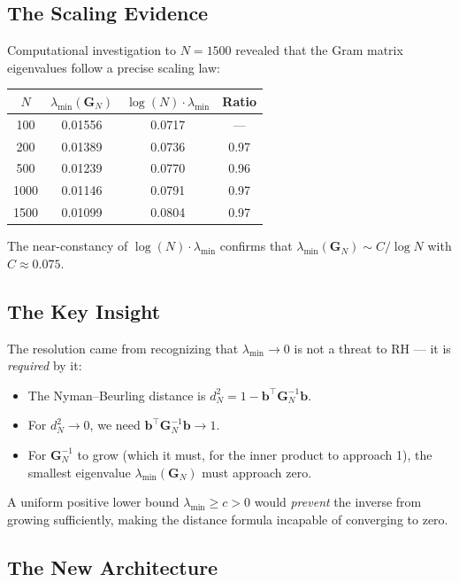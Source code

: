 \documentclass[11pt,a4paper]{article}
\theoremstyle{definition}
\theoremstyle{remark}
\newcommand{\Gram}{\mathbf{G}}
\newcommand{\lmin}{\lambda_{\min}}
\begin{document}
\subsection{The Scaling Evidence}

Computational investigation to $N = 1500$ revealed that the Gram matrix
eigenvalues follow a precise scaling law:

\begin{center}
\begin{tabular}{cccc}
\hline
$N$ & $\lmin(\Gram_N)$ & $\log(N) \cdot \lmin$ & Ratio \\
\hline
100  & 0.01556 & 0.0717 & --- \\
200  & 0.01389 & 0.0736 & 0.97 \\
500  & 0.01239 & 0.0770 & 0.96 \\
1000 & 0.01146 & 0.0791 & 0.97 \\
1500 & 0.01099 & 0.0804 & 0.97 \\
\hline
\end{tabular}
\end{center}

The near-constancy of $\log(N) \cdot \lmin$ confirms that
$\lmin(\Gram_N) \sim C/\!\log N$ with $C \approx 0.075$.

\subsection{The Key Insight}

The resolution came from recognizing that $\lmin \to 0$ is not a threat
to RH --- it is \emph{required} by it:

\begin{itemize}
  \item The Nyman--Beurling distance is
    $d_N^2 = 1 - \mathbf{b}^\top \Gram_N^{-1} \mathbf{b}$.
  \item For $d_N^2 \to 0$, we need $\mathbf{b}^\top \Gram_N^{-1} \mathbf{b} \to 1$.
  \item For $\Gram_N^{-1}$ to grow (which it must, for the inner product
    to approach 1), the smallest eigenvalue $\lmin(\Gram_N)$ must
    approach zero.
\end{itemize}

A uniform positive lower bound $\lmin \geq c > 0$ would \emph{prevent}
the inverse from growing sufficiently, making the distance formula
incapable of converging to zero.

\subsection{The New Architecture}
\end{document}
